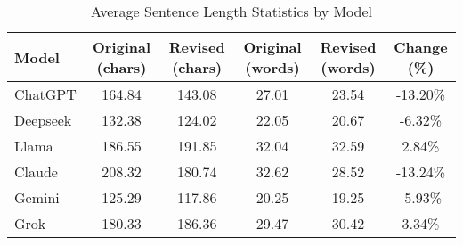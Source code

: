 \begin{table}[ht]
\centering
\caption{Average Sentence Length Statistics by Model}
\begin{tabular}{l|cc|cc|c}
\hline
Model & Original (chars) & Revised (chars) & Original (words) & Revised (words) & Change (\%) \\ \hline
ChatGPT & 164.84 & 143.08 & 27.01 & 23.54 & -13.20\% \\
Deepseek & 132.38 & 124.02 & 22.05 & 20.67 & -6.32\% \\
Llama & 186.55 & 191.85 & 32.04 & 32.59 & 2.84\% \\
Claude & 208.32 & 180.74 & 32.62 & 28.52 & -13.24\% \\
Gemini & 125.29 & 117.86 & 20.25 & 19.25 & -5.93\% \\
Grok & 180.33 & 186.36 & 29.47 & 30.42 & 3.34\% \\
\hline
\end{tabular}
\label{tab:model_length_stats}
\end{table}